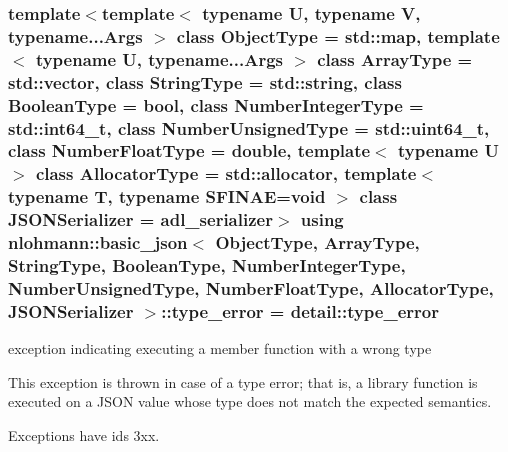 \subsubsection[{\texorpdfstring{type\+\_\+error}{type_error}}]{\setlength{\rightskip}{0pt plus 5cm}template$<$template$<$ typename U, typename V, typename...\+Args $>$ class Object\+Type = std\+::map, template$<$ typename U, typename...\+Args $>$ class Array\+Type = std\+::vector, class String\+Type  = std\+::string, class Boolean\+Type  = bool, class Number\+Integer\+Type  = std\+::int64\+\_\+t, class Number\+Unsigned\+Type  = std\+::uint64\+\_\+t, class Number\+Float\+Type  = double, template$<$ typename U $>$ class Allocator\+Type = std\+::allocator, template$<$ typename T, typename S\+F\+I\+N\+A\+E=void $>$ class J\+S\+O\+N\+Serializer = adl\+\_\+serializer$>$ using {\bf nlohmann\+::basic\+\_\+json}$<$ Object\+Type, Array\+Type, String\+Type, Boolean\+Type, Number\+Integer\+Type, Number\+Unsigned\+Type, Number\+Float\+Type, Allocator\+Type, J\+S\+O\+N\+Serializer $>$\+::{\bf type\+\_\+error} =  {\bf detail\+::type\+\_\+error}}\hypertarget{classnlohmann_1_1basic__json_a4010e8e268fefd86da773c10318f2902}{}\label{classnlohmann_1_1basic__json_a4010e8e268fefd86da773c10318f2902}


exception indicating executing a member function with a wrong type 

This exception is thrown in case of a type error; that is, a library function is executed on a J\+S\+ON value whose type does not match the expected semantics.

Exceptions have ids 3xx.

